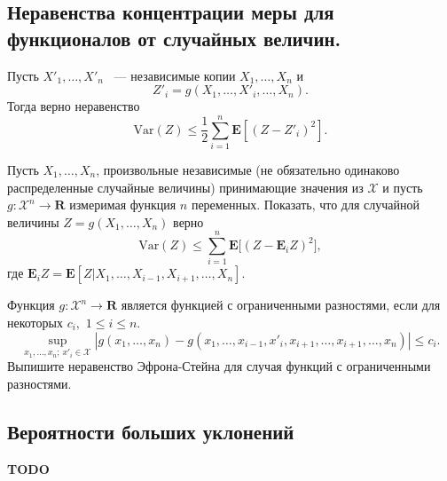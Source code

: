 \subsection{Неравенства концентрации меры для функционалов от случайных величин.}

\medskip

\begin{problem}
Пусть $X'_1,\dots,X'_n$ ~--- независимые копии $X_1,\dots,X_n$ и 
\begin{equation*}
Z'_i = g(X_1,\dots, X'_i,\dots,X_n).
\end{equation*}
Тогда верно неравенство 
\begin{equation*}
\text{Var}(Z)\leq \frac{1}{2}\sum_{i=1}^{n}\mathbf{E}[(Z-Z'_i)^2].
\end{equation*}
\end{problem}
\begin{remark}
 
Пусть $X_1,\dots, X_n$, произвольные независимые (не обязательно одинаково распределенные случайные величины) принимающие значения из $\mathcal{X}$ и пусть  $g: \mathcal{X}^n\to \mathbf{R}$ измеримая функция $n$ переменных. Показать, что для случайной величины $Z = g(X_1,\dots,X_n)$ верно 
\begin{equation*}
\text{Var}(Z) \leq \sum_{i=1}^n \mathbf{E}\big[ (Z-\mathbf{E}_iZ)^2\bigl],
\end{equation*}
где $\mathbf{E}_iZ = \mathbf{E}[Z|X_1,\dots,X_{i-1},X_{i+1},\dots,X_n]$.
\end{remark}
\begin{problem}
Функция $g: \mathcal{X}^n\to \mathbf{R}$ является функцией с ограниченными разностями, если для некоторых $c_i,$  $1\leq i\leq n$.
\begin{equation*}
\sup_{x_1,\dots,x_n;\, x'_i\in\mathcal{X}} |g(x_1,\dots,x_n)-g(x_1,\dots,x_{i-1},x'_i,x_{i+1},\dots,x_{i+1},\dots,x_n)|\leq c_i. 
\end{equation*}
Выпишите неравенство Эфрона-Стейна для случая функций с ограниченными разностями.
\end{problem}
\medskip

\subsection{Вероятности больших уклонений}

\textbf{TODO}
